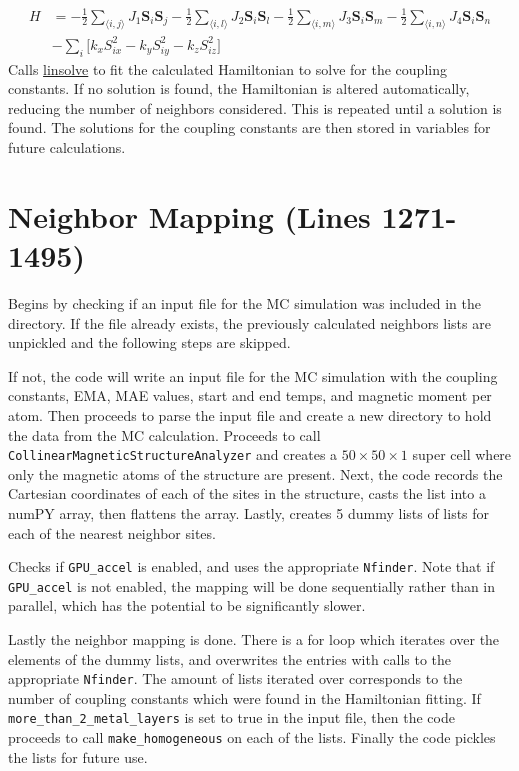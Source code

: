 \documentclass[12pt]{article}
\newcommand{\pmint}[1]{\texttt{#1}}
\begin{document}
\begin{align*}
    H &= -\frac{1}{2}\sum_{\langle i,j\rangle } J_1\textbf{S}_i\textbf{S}_j-\frac{1}{2}\sum_{\langle i,l\rangle} J_2\textbf{S}_i\textbf{S}_l-\frac{1}{2}\sum_{\langle i,m\rangle} J_3\textbf{S}_i\textbf{S}_m-\frac{1}{2}\sum_{\langle i,n\rangle} J_4\textbf{S}_i\textbf{S}_n \\
    &- \sum_i\Big[ k_xS_{ix}^2 - k_y S_{iy}^2- k_z S_{iz}^2\Big]
\end{align*}
Calls \href{https://docs.sympy.org/latest/modules/solvers/solveset.html#sympy.solvers.solveset.linsolve}{linsolve} to fit the calculated Hamiltonian to solve for the coupling constants. If no solution is found, the Hamiltonian is altered automatically, reducing the number of neighbors considered. This is repeated until a solution is found. The solutions for the coupling constants are then stored in variables for future calculations. 

\section*{Neighbor Mapping (Lines 1271-1495)} %
Begins by checking if an input file for the MC simulation was included in the directory. If the file already exists, the previously calculated neighbors lists are unpickled and the following steps are skipped. 

If not, the code will write an input file for the MC simulation with the coupling constants, EMA, MAE values, start and end temps, and magnetic moment per atom. Then proceeds to parse the input file and create a new directory to hold the data from the MC calculation. Proceeds to call \pmint{CollinearMagneticStructureAnalyzer} and creates a $50 \times 50 \times 1$ super cell where only the magnetic atoms of the structure are present. Next, the code records the Cartesian coordinates of each of the sites in the structure, casts the list into a numPY array, then flattens the array. Lastly, creates 5 dummy lists of lists for each of the nearest neighbor sites. 

Checks if \pmint{GPU_accel} is enabled, and uses the appropriate \pmint{Nfinder}. Note that if \pmint{GPU_accel} is not enabled, the mapping will be done sequentially rather than in parallel, which has the potential to be significantly slower. 

Lastly the neighbor mapping is done. There is a for loop which iterates over the elements of the dummy lists, and overwrites the entries with calls to the appropriate \pmint{Nfinder}. The amount of lists iterated over corresponds to the number of coupling constants which were found in the Hamiltonian fitting. If \pmint{more_than_2_metal_layers} is set to true in the input file, then the code proceeds to call \pmint{make_homogeneous} on each of the lists. Finally the code pickles the lists for future use. 
\end{document}
